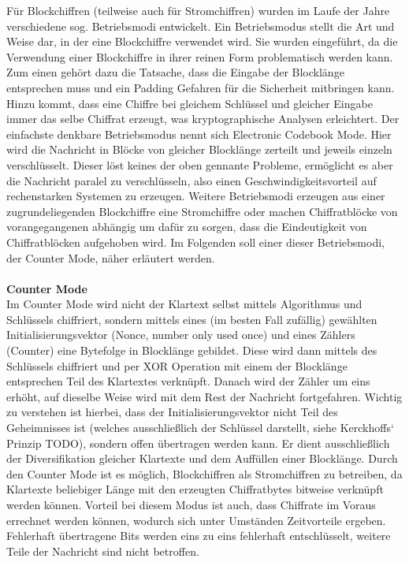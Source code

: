 \documentclass[12pt,a4paper,bibliography=totocnumbered,listof=totocnumbered]{scrartcl}
\begin{document}
Für Blockchiffren (teilweise auch für Stromchiffren) wurden im Laufe der Jahre verschiedene sog. Betriebsmodi entwickelt. Ein Betriebsmodus stellt die Art und Weise dar, in der eine Blockchiffre verwendet wird. Sie wurden eingeführt, da die Verwendung einer Blockchiffre in ihrer reinen Form problematisch werden kann. Zum einen gehört dazu die Tatsache, dass die Eingabe der Blocklänge entsprechen muss und ein Padding Gefahren für die Sicherheit mitbringen kann. Hinzu kommt, dass eine Chiffre bei gleichem Schlüssel und gleicher Eingabe immer das selbe Chiffrat erzeugt, was kryptographische Analysen erleichtert. Der einfachste denkbare Betriebsmodus nennt sich Electronic Codebook Mode. Hier wird die Nachricht in Blöcke von gleicher Blocklänge zerteilt und jeweils einzeln verschlüsselt. Dieser löst keines der oben gennante Probleme, ermöglicht es aber die Nachricht paralel zu verschlüsseln, also einen Geschwindigkeitsvorteil auf rechenstarken Systemen zu erzeugen. Weitere Betriebsmodi erzeugen aus einer zugrundeliegenden Blockchiffre eine Stromchiffre oder machen Chiffratblöcke von vorangegangenen abhängig um dafür zu sorgen, dass die Eindeutigkeit von Chiffratblöcken aufgehoben wird. Im Folgenden soll einer dieser Betriebsmodi, der Counter Mode, näher erläutert werden.\\
 \cite[S. 223ff.]{42}
\\\textbf{Counter Mode}\\
Im Counter Mode wird nicht der Klartext selbst mittels Algorithmus und Schlüssels chiffriert, sondern mittels eines (im besten Fall zufällig) gewählten Initialisierungsvektor (Nonce, number only used once) und eines Zählers (Counter) eine Bytefolge in Blocklänge gebildet. Diese wird dann mittels des Schlüssels chiffriert und per XOR Operation mit einem der Blocklänge entsprechen Teil des Klartextes verknüpft. Danach wird der Zähler um eins erhöht, auf dieselbe Weise wird mit dem Rest der Nachricht fortgefahren. Wichtig zu verstehen ist hierbei, dass der Initialisierungsvektor nicht Teil des Geheimnisses ist (welches ausschließlich der Schlüssel darstellt, siehe Kerckhoffs‘ Prinzip TODO), sondern offen übertragen werden kann. Er dient ausschließlich der Diversifikation gleicher Klartexte und dem Auffüllen einer Blocklänge. Durch den Counter Mode ist es möglich, Blockchiffren als Stromchiffren zu betreiben, da Klartexte beliebiger Länge mit den erzeugten Chiffratbytes bitweise verknüpft werden können. Vorteil bei diesem Modus ist auch, dass Chiffrate im Voraus errechnet werden können, wodurch sich unter Umständen Zeitvorteile ergeben. Fehlerhaft übertragene Bits werden eins zu eins fehlerhaft entschlüsselt, weitere Teile der Nachricht sind nicht betroffen.\\
\end{document}
